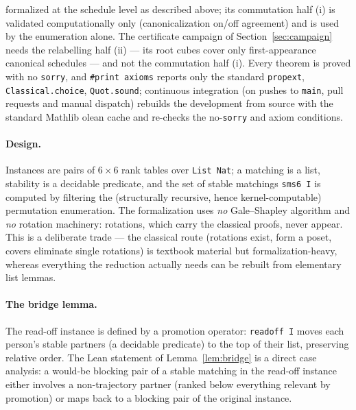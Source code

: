 \documentclass[11pt]{article}
\begin{document}
formalized at the schedule level as described above; its commutation half (i) is validated
computationally only (canonicalization on/off agreement) and
is used by the enumeration alone. The certificate campaign of Section~\ref{sec:campaign} needs
the relabelling half (ii) --- its root cubes cover only first-appearance canonical schedules ---
and not the commutation half (i). Every theorem is proved with no \texttt{sorry}, and
\texttt{\#print axioms} reports only the standard \texttt{propext}, \texttt{Classical.choice},
\texttt{Quot.sound}; continuous integration (on pushes to \texttt{main}, pull requests and manual
dispatch) rebuilds the development from source with the standard Mathlib olean cache and re-checks
the no-\texttt{sorry} and axiom conditions.

\paragraph{Design.} Instances are pairs of $6\times 6$ rank tables over
\texttt{List Nat}; a matching is a list, stability is a decidable predicate, and the
set of stable matchings \texttt{sms6 I} is computed by filtering the (structurally
recursive, hence kernel-computable) permutation enumeration. The formalization uses
\emph{no} Gale--Shapley algorithm and \emph{no} rotation machinery: rotations, which
carry the classical proofs, never appear. This is a deliberate trade --- the
classical route (rotations exist, form a poset, covers eliminate single rotations)
is textbook material but formalization-heavy, whereas everything the reduction
actually needs can be rebuilt from elementary list lemmas.

\paragraph{The bridge lemma.} The read-off instance is defined by a promotion
operator: \texttt{readoff I} moves each person's stable partners (a decidable
predicate) to the top of their list, preserving relative order. The Lean statement
of Lemma~\ref{lem:bridge} is a direct case analysis: a would-be blocking pair of a
stable matching in the read-off instance either involves a non-trajectory partner
(ranked below everything relevant by promotion) or maps back to a blocking pair of
the original instance.
\end{document}
